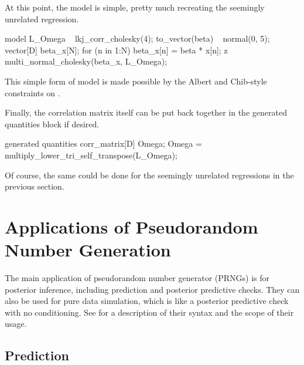 At this point, the model is simple, pretty much recreating the
seemingly unrelated regression.
%
\begin{stancode}
model {
  L_Omega ~ lkj_corr_cholesky(4);
  to_vector(beta) ~ normal(0, 5);
  { 
    vector[D] beta_x[N];
    for (n in 1:N) 
      beta_x[n] = beta * x[n];
    z ~ multi_normal_cholesky(beta_x, L_Omega);
  }
}
\end{stancode}
%
This simple form of model is made possible by the Albert and
Chib-style constraints on .

Finally, the correlation matrix itself can be put back together in the
generated quantities block if desired. 
%
\begin{stancode}
generated quantities {
  corr_matrix[D] Omega;
  Omega = multiply_lower_tri_self_transpose(L_Omega);  
}
\end{stancode}
%
Of course, the same could be done for the seemingly unrelated
regressions in the previous section.

\section{Applications of Pseudorandom Number Generation}

The main application of pseudorandom number generator (PRNGs) is for
posterior inference, including prediction and posterior predictive
checks.  They can also be used for pure data simulation, which is like
a posterior predictive check with no conditioning.  See
 for a description of their syntax and
the scope of their usage.

\subsection{Prediction}

